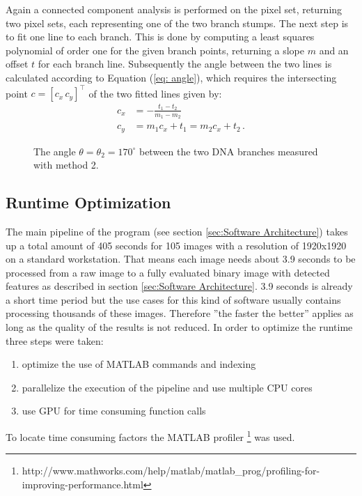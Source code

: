 \documentclass{article}
\begin{document}
  Again a connected component analysis is performed on the pixel set, returning two pixel sets, each representing one of the two branch stumps.
The next step is to fit one line to each branch. This is done by computing a least squares polynomial of order one for the given branch points, returning a slope $m$ and an offset $t$ for each branch line.
Subsequently the angle between the two lines is calculated according to Equation (\ref{eq: angle}), which requires the intersecting point $c = [c_x\, c_y]^{\top}$ of the two fitted lines given by:
\begin{align*}
c_x &= -\frac{t_1-t_2}{m_1-m_2}\\
c_y &= m_1 c_x + t_1 = m_2 c_x + t_2\, .
\end{align*}

\begin{figure}[htb!]
\centering
\def\svgwidth{0.5\textwidth}

\caption{The angle $\theta=\theta_2 = 170^{\circ}$ between the two DNA branches measured with method 2.}\label{fig: angle2}
\end{figure}


\subsection{Runtime Optimization}\label{sec:Runtime Optimization}
The main pipeline of the program (see section \ref{sec:Software Architecture}) takes up a total amount of 405 seconds for 105 images with a resolution of 1920x1920  on a standard workstation.
That means each image needs about 3.9 seconds to be processed from a raw image to a fully evaluated binary image with detected features as described in section \ref{sec:Software Architecture}.
3.9 seconds is already a short time period but the use cases for this kind of software usually contains processing thousands of these images.
Therefore ''the faster the better'' applies as long as the quality of the results is not reduced.
In order to optimize the runtime three steps were taken:

\begin{enumerate}
	\item optimize the use of MATLAB commands and indexing
	\item parallelize the execution of the pipeline and use multiple CPU cores
	\item use GPU for time consuming function calls
\end{enumerate}

To locate time consuming factors the MATLAB profiler \footnote{http://www.mathworks.com/help/matlab/matlab\_prog/profiling-for-improving-performance.html} was used.
\end{document}
